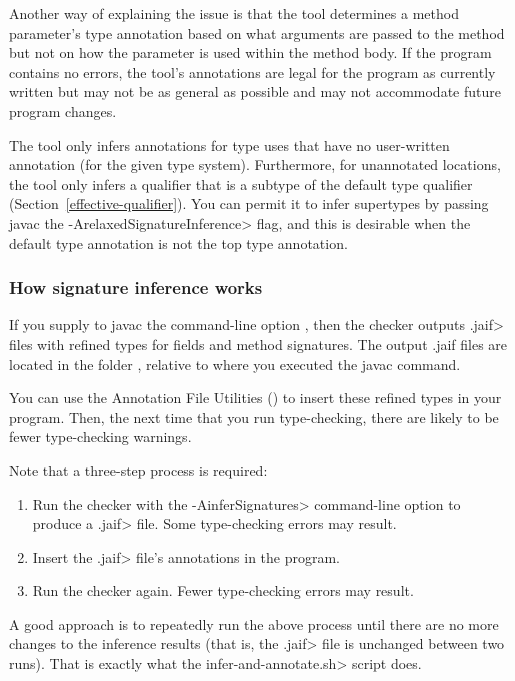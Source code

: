 Another way of explaining the issue is that the tool determines a method parameter's type
annotation based on what arguments are passed to the method but not on how the
parameter is used within the method body.  If the program contains
no errors, the tool's annotations are legal for the program as
currently written but may not be as general as possible and may not
accommodate future program changes.

The tool only infers annotations for type uses that have no user-written
annotation (for the given type system).
Furthermore, for unannotated locations, the tool only infers a qualifier
that is a subtype of the default type qualifier
(Section~\ref{effective-qualifier}).
You can permit it to infer supertypes
by passing javac the \<-ArelaxedSignatureInference> flag, and this is desirable when
the default type annotation is not the top type annotation.


\subsubsection{How signature inference works\label{how-signature-inference-works}}

If you
supply to javac the command-line option , then the
checker outputs \<.jaif> files with refined types for fields and method signatures.
The output .jaif files are located in the folder ,
relative to where you executed the javac command.

You can use the Annotation File Utilities
() to
insert these refined types in your program.  Then, the next time that you
run type-checking, there are likely to be fewer type-checking warnings.

Note that a three-step process is required:
\begin{enumerate}
\item Run the checker with the \<-AinferSignatures> command-line option to
  produce a \<.jaif> file.  Some type-checking errors may result.
\item Insert the \<.jaif> file's annotations in the program.
\item Run the checker again.  Fewer type-checking errors may result.
\end{enumerate}
\noindent
A good approach is to repeatedly run the above process until there are no
more changes to the inference results (that is, the \<.jaif> file is
unchanged between two runs).  That is exactly what the
\<infer-and-annotate.sh> script does.

